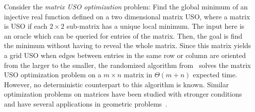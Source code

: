 \documentclass[runningheads,a4paper]{llncs}
\newcommand{\AT}[1]{\marginpar{\parbox{3.6cm}{{\small {\bf AT:} #1}}}} %
\begin{document}



Consider the %
\emph{matrix USO optimization} problem: Find the global minimum of an injective real function defined on a two dimensional matrix USO, where a matrix is USO 
if each $2\times 2$ sub-matrix has a unique local minimum. 
The input here is an oracle which can be queried for entries of the matrix. Then, the goal is find the minimum without having to reveal the whole matrix.
Since this matrix yields a grid USO when edges between entries in the same row or column are oriented from the larger to the smaller, the randomized algorithm from~\citet{grid08} solves the matrix USO optimization problem on a $m\times n$ matrix in $\Theta(m+n)$ expected time. However, no deterministic counterpart to this algorithm is known. 
Similar optimization problems on matrices have been studied with stronger conditions and have several applications in geometric problems~\cite{aggarwal1987geometric,demaine2005optimizing,galil1992dynamic,mityagin2003complexity}.
\end{document}
